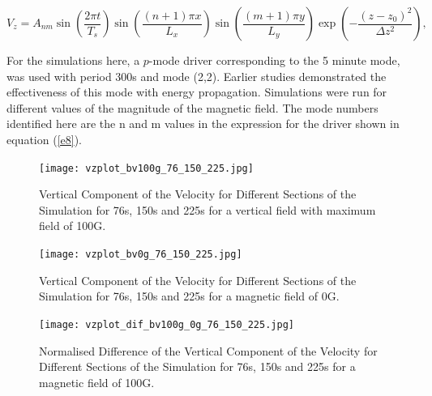 \documentclass[linenumbers]{aastex63}
\begin{document}
\begin{equation}
 V_{z}  =  A_{nm} \sin\left(\frac{2\pi t}{T_s} \right)\sin\left(  \frac{(n+1)\pi x}{L_x} \right)  
 \sin\left(\frac{(m+1)\pi y}{L_y} \right) \exp\left( -\frac{(z-z_0)^2}{\Delta z^2} \right),
\label{e8}
\end{equation}

For the  simulations here, a $p$-mode driver corresponding to the 5 minute mode, was used with period 300s and mode (2,2). Earlier studies demonstrated the effectiveness of this mode with energy propagation. Simulations were run for different values of the magnitude of the magnetic field. The mode numbers identified here are the n and m values in the expression for the driver shown in equation (\ref{e8}).


\begin{figure}\label{vzplot_bv100g_76_150_225}
\texttt{[image: vzplot\_bv100g\_76\_150\_225.jpg]}
\caption{Vertical Component of the Velocity for Different Sections of the Simulation for 76s, 150s and 225s for a vertical field with maximum field of 100G.}
\end{figure}



\begin{figure}\label{vzplot_bv0g_76_150_225}
\texttt{[image: vzplot\_bv0g\_76\_150\_225.jpg]}
\caption{Vertical Component of the Velocity for Different Sections of the Simulation for 76s, 150s and 225s for a magnetic field of 0G.}
\end{figure}



\begin{figure}\label{vzplot_bv100g_0g_76_150_225}
\texttt{[image: vzplot\_dif\_bv100g\_0g\_76\_150\_225.jpg]}
\caption{Normalised Difference of the Vertical Component of the Velocity for Different Sections of the Simulation for 76s, 150s and 225s for a magnetic field of 100G.}
\end{figure}
\end{document}
